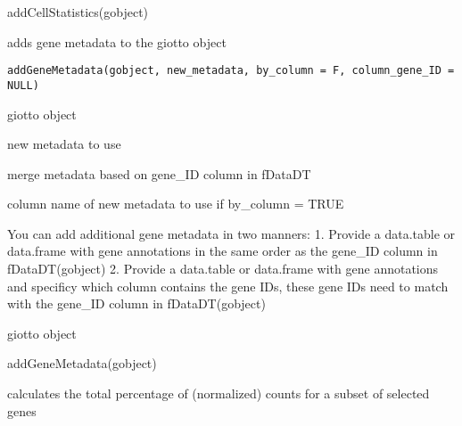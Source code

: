 \documentclass[a4paper]{book}
\begin{document}
%
\begin{Examples}
\begin{ExampleCode}
    addCellStatistics(gobject)
\end{ExampleCode}
\end{Examples}
%
\begin{Description}\relax
adds gene metadata to the giotto object
\end{Description}
%
\begin{Usage}
\begin{verbatim}
addGeneMetadata(gobject, new_metadata, by_column = F, column_gene_ID = NULL)
\end{verbatim}
\end{Usage}
%
\begin{Arguments}
\begin{ldescription}
\item[\code{gobject}] giotto object

\item[\code{new\_metadata}] new metadata to use

\item[\code{by\_column}] merge metadata based on gene\_ID column in fDataDT

\item[\code{column\_cell\_ID}] column name of new metadata to use if by\_column = TRUE
\end{ldescription}
\end{Arguments}
%
\begin{Details}\relax
You can add additional gene metadata in two manners:
1. Provide a data.table or data.frame with gene annotations in the same order as the gene\_ID column in fDataDT(gobject)
2. Provide a data.table or data.frame with gene annotations and specificy which column contains the gene IDs,
these gene IDs need to match with the gene\_ID column in fDataDT(gobject)
\end{Details}
%
\begin{Value}
giotto object
\end{Value}
%
\begin{Examples}
\begin{ExampleCode}
    addGeneMetadata(gobject)
\end{ExampleCode}
\end{Examples}
%
\begin{Description}\relax
calculates the total percentage of (normalized) counts for a subset of selected genes
\end{Description}
\end{document}
